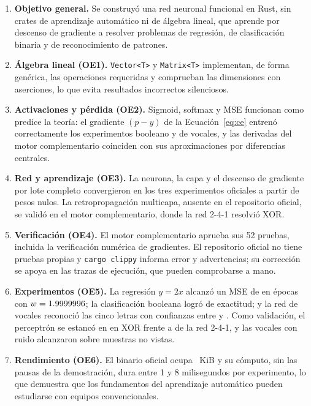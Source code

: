 \begin{enumerate}[leftmargin=2em,itemsep=6pt]
\item \textbf{Objetivo general.} Se construyó una red neuronal funcional en Rust, sin crates de aprendizaje automático ni de álgebra lineal, que aprende por descenso de gradiente a resolver problemas de regresión, de clasificación binaria y de reconocimiento de patrones.
\item \textbf{Álgebra lineal (OE1).} \texttt{Vector<T>} y \texttt{Matrix<T>} implementan, de forma genérica, las operaciones requeridas y comprueban las dimensiones con aserciones, lo que evita resultados incorrectos silenciosos.
\item \textbf{Activaciones y pérdida (OE2).} Sigmoid, softmax y MSE funcionan como predice la teoría: el gradiente $(p-y)$ de la Ecuación~\eqref{eq:ce} entrenó correctamente los experimentos booleano y de vocales, y las derivadas del motor complementario coinciden con sus aproximaciones por diferencias centrales.
\item \textbf{Red y aprendizaje (OE3).} La neurona, la capa y el descenso de gradiente por lote completo convergieron en los tres experimentos oficiales a partir de pesos nulos. La retropropagación multicapa, ausente en el repositorio oficial, se validó en el motor complementario, donde la red 2-4-1 resolvió XOR.
\item \textbf{Verificación (OE4).} El motor complementario aprueba sus 52 pruebas, incluida la verificación numérica de gradientes. El repositorio oficial no tiene pruebas propias y \texttt{cargo clippy} informa \OfClippyErr{} error y \OfClippyWarn{} advertencias; su corrección se apoya en las trazas de ejecución, que pueden comprobarse a mano.
\item \textbf{Experimentos (OE5).} La regresión $y=2x$ alcanzó un MSE de \OfLinMseFin{} en \OfLinEpocas{} épocas con $w=1.9999996$; la clasificación booleana logró \OfBoolAcc{} de exactitud; y la red de vocales reconoció las cinco letras con confianzas entre \OfVocConfMin{} y \OfVocConfMax. Como validación, el perceptrón se estancó en \EdosAccPer{} en XOR frente a \EdosAccMul{} de la red 2-4-1, y las vocales con ruido alcanzaron \EtresAccPru{} sobre \EtresNPru{} muestras no vistas.
\item \textbf{Rendimiento (OE6).} El binario oficial ocupa \OfBinKiB~KiB y su cómputo, sin las pausas de la demostración, dura entre 1 y 8 milisegundos por experimento, lo que demuestra que los fundamentos del aprendizaje automático pueden estudiarse con equipos convencionales.
\end{enumerate}

